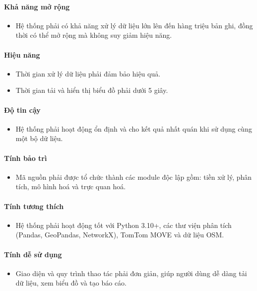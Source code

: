\paragraph{Khả năng mở rộng}
\begin{itemize}
    \item Hệ thống phải có khả năng xử lý dữ liệu lớn lên đến hàng triệu bản ghi, đồng thời có thể mở rộng mà không suy giảm hiệu năng.
\end{itemize}

\paragraph{Hiệu năng}
\begin{itemize}
    \item Thời gian xử lý dữ liệu phải đảm bảo hiệu quả.
    \item Thời gian tải và hiển thị biểu đồ phải dưới 5 giây.
\end{itemize}

\paragraph{Độ tin cậy}
\begin{itemize}
    \item Hệ thống phải hoạt động ổn định và cho kết quả nhất quán khi sử dụng cùng một bộ dữ liệu.
\end{itemize}

\paragraph{Tính bảo trì}
\begin{itemize}
    \item Mã nguồn phải được tổ chức thành các module độc lập gồm: tiền xử lý, phân tích, mô hình hoá và trực quan hoá.
\end{itemize}

\paragraph{Tính tương thích}
\begin{itemize}
    \item Hệ thống phải hoạt động tốt với Python 3.10+, các thư viện phân tích (Pandas, GeoPandas, NetworkX), TomTom MOVE và dữ liệu OSM.
\end{itemize}
\paragraph{Tính dễ sử dụng}
\begin{itemize}
    \item Giao diện và quy trình thao tác phải đơn giản, giúp người dùng dễ dàng tải dữ liệu, xem biểu đồ và tạo báo cáo.
\end{itemize}
